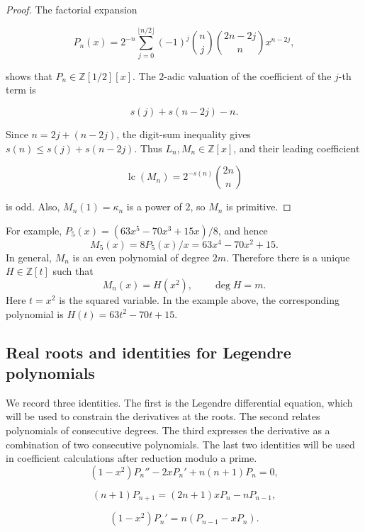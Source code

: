 \documentclass[11pt,a4paper]{article}
\numberwithin{equation}{section}
\theoremstyle{definition}
\begin{document}
\begin{proof}
The factorial expansion

\begin{equation}
P_n(x)=2^{-n}\sum_{j=0}^{\lfloor n/2\rfloor}
(-1)^j\binom nj\binom{2n-2j}{n}x^{n-2j},
\label{eq:old1.2}
\end{equation}

shows that \(P_n\in\mathbb Z[1/2][x]\). The $2$-adic valuation of the coefficient of the \(j\)-th term is

\[
s(j)+s(n-2j)-n.
\]

Since \(n=2j+(n-2j)\), the digit-sum inequality gives \(s(n)\le s(j)+s(n-2j)\). Thus \(L_n,M_n\in\mathbb Z[x]\), and their leading coefficient

\[
\operatorname{lc}(M_n)=2^{-s(n)}\binom{2n}{n}
\]

is odd. Also, \(M_n(1)=\kappa_n\) is a power of $2$, so \(M_n\) is primitive.
\end{proof}

For example, \(P_5(x)=(63x^5-70x^3+15x)/8\), and hence
\[
M_5(x)=8P_5(x)/x=63x^4-70x^2+15.
\]
In general, \(M_n\) is an even polynomial of degree \(2m\). Therefore there is a unique \(H\in\mathbb Z[t]\) such that
\[
M_n(x)=H(x^2),\qquad\deg H=m.
\]
Here \(t=x^2\) is the squared variable. In the example above, the corresponding polynomial is \(H(t)=63t^2-70t+15\).

\subsection{Real roots and identities for Legendre polynomials}

We record three identities. The first is the Legendre differential equation, which will be used to constrain the derivatives at the roots. The second relates polynomials of consecutive degrees. The third expresses the derivative as a combination of two consecutive polynomials. The last two identities will be used in coefficient calculations after reduction modulo a prime.\begin{equation}
(1-x^2)P_n''-2xP_n'+n(n+1)P_n=0,
\label{eq:old1.3}
\end{equation}

\begin{equation}
(n+1)P_{n+1}=(2n+1)xP_n-nP_{n-1},
\label{eq:old1.4}
\end{equation}

\begin{equation}
(1-x^2)P_n'=n(P_{n-1}-xP_n).
\label{eq:old1.5}
\end{equation}
\end{document}
